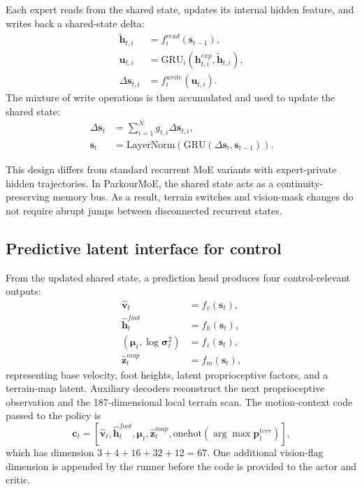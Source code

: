 \documentclass[letterpaper,10pt,conference]{ieeeconf}
\begin{document}
Each expert reads from the shared state, updates its internal hidden feature, and writes back a shared-state delta:
\begin{align}
\tilde{\mathbf{h}}_{t,i} &= f^{read}_i(\mathbf{s}_{t-1}), \\
\mathbf{u}_{t,i} &= \mathrm{GRU}_i(\mathbf{h}^{exp}_{t,i}, \tilde{\mathbf{h}}_{t,i}), \\
\Delta \mathbf{s}_{t,i} &= f^{write}_i(\mathbf{u}_{t,i}).
\end{align}
The mixture of write operations is then accumulated and used to update the shared state:
\begin{align}
\Delta \mathbf{s}_{t} &= \sum_{i=1}^{N} g_{t,i} \Delta \mathbf{s}_{t,i}, \\
\mathbf{s}_t &= \mathrm{LayerNorm}(\mathrm{GRU}(\Delta \mathbf{s}_{t}, \mathbf{s}_{t-1})).
\end{align}

This design differs from standard recurrent MoE variants with expert-private hidden trajectories. In ParkourMoE, the shared state acts as a continuity-preserving memory bus. As a result, terrain switches and vision-mask changes do not require abrupt jumps between disconnected recurrent states.

\subsection{Predictive latent interface for control}
From the updated shared state, a prediction head produces four control-relevant outputs:
\begin{align}
\hat{\mathbf{v}}_t &= f_v(\mathbf{s}_t), \\
\hat{\mathbf{h}}^{foot}_t &= f_h(\mathbf{s}_t), \\
(\boldsymbol{\mu}_t, \log \boldsymbol{\sigma}^2_t) &= f_z(\mathbf{s}_t), \\
\hat{\mathbf{z}}^{map}_t &= f_m(\mathbf{s}_t),
\end{align}
representing base velocity, foot heights, latent proprioceptive factors, and a terrain-map latent. Auxiliary decoders reconstruct the next proprioceptive observation and the 187-dimensional local terrain scan. The motion-context code passed to the policy is
\begin{equation}
\mathbf{c}_t = [\hat{\mathbf{v}}_t, \hat{\mathbf{h}}^{foot}_t, \boldsymbol{\mu}_t, \hat{\mathbf{z}}^{map}_t, \mathrm{onehot}(\arg\max \mathbf{p}^{terr}_t)],
\end{equation}
which has dimension $3 + 4 + 16 + 32 + 12 = 67$. One additional vision-flag dimension is appended by the runner before the code is provided to the actor and critic.
\end{document}

